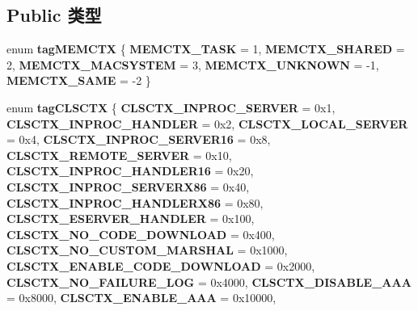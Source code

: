 \subsection*{Public 类型}
\begin{DoxyCompactItemize}
\item 
\mbox{\label{interface_i_win_types_a9f3ae7ecdd308d3515e985c7348262c6}} 
enum {\bfseries tag\+M\+E\+M\+C\+TX} \{ \newline
{\bfseries M\+E\+M\+C\+T\+X\+\_\+\+T\+A\+SK} = 1, 
{\bfseries M\+E\+M\+C\+T\+X\+\_\+\+S\+H\+A\+R\+ED} = 2, 
{\bfseries M\+E\+M\+C\+T\+X\+\_\+\+M\+A\+C\+S\+Y\+S\+T\+EM} = 3, 
{\bfseries M\+E\+M\+C\+T\+X\+\_\+\+U\+N\+K\+N\+O\+WN} = -\/1, 
\newline
{\bfseries M\+E\+M\+C\+T\+X\+\_\+\+S\+A\+ME} = -\/2
 \}
\item 
\mbox{\label{interface_i_win_types_adf475a0cc4529d6fc873171af2eef672}} 
enum {\bfseries tag\+C\+L\+S\+C\+TX} \{ \newline
{\bfseries C\+L\+S\+C\+T\+X\+\_\+\+I\+N\+P\+R\+O\+C\+\_\+\+S\+E\+R\+V\+ER} = 0x1, 
{\bfseries C\+L\+S\+C\+T\+X\+\_\+\+I\+N\+P\+R\+O\+C\+\_\+\+H\+A\+N\+D\+L\+ER} = 0x2, 
{\bfseries C\+L\+S\+C\+T\+X\+\_\+\+L\+O\+C\+A\+L\+\_\+\+S\+E\+R\+V\+ER} = 0x4, 
{\bfseries C\+L\+S\+C\+T\+X\+\_\+\+I\+N\+P\+R\+O\+C\+\_\+\+S\+E\+R\+V\+E\+R16} = 0x8, 
\newline
{\bfseries C\+L\+S\+C\+T\+X\+\_\+\+R\+E\+M\+O\+T\+E\+\_\+\+S\+E\+R\+V\+ER} = 0x10, 
{\bfseries C\+L\+S\+C\+T\+X\+\_\+\+I\+N\+P\+R\+O\+C\+\_\+\+H\+A\+N\+D\+L\+E\+R16} = 0x20, 
{\bfseries C\+L\+S\+C\+T\+X\+\_\+\+I\+N\+P\+R\+O\+C\+\_\+\+S\+E\+R\+V\+E\+R\+X86} = 0x40, 
{\bfseries C\+L\+S\+C\+T\+X\+\_\+\+I\+N\+P\+R\+O\+C\+\_\+\+H\+A\+N\+D\+L\+E\+R\+X86} = 0x80, 
\newline
{\bfseries C\+L\+S\+C\+T\+X\+\_\+\+E\+S\+E\+R\+V\+E\+R\+\_\+\+H\+A\+N\+D\+L\+ER} = 0x100, 
{\bfseries C\+L\+S\+C\+T\+X\+\_\+\+N\+O\+\_\+\+C\+O\+D\+E\+\_\+\+D\+O\+W\+N\+L\+O\+AD} = 0x400, 
{\bfseries C\+L\+S\+C\+T\+X\+\_\+\+N\+O\+\_\+\+C\+U\+S\+T\+O\+M\+\_\+\+M\+A\+R\+S\+H\+AL} = 0x1000, 
{\bfseries C\+L\+S\+C\+T\+X\+\_\+\+E\+N\+A\+B\+L\+E\+\_\+\+C\+O\+D\+E\+\_\+\+D\+O\+W\+N\+L\+O\+AD} = 0x2000, 
\newline
{\bfseries C\+L\+S\+C\+T\+X\+\_\+\+N\+O\+\_\+\+F\+A\+I\+L\+U\+R\+E\+\_\+\+L\+OG} = 0x4000, 
{\bfseries C\+L\+S\+C\+T\+X\+\_\+\+D\+I\+S\+A\+B\+L\+E\+\_\+\+A\+AA} = 0x8000, 
{\bfseries C\+L\+S\+C\+T\+X\+\_\+\+E\+N\+A\+B\+L\+E\+\_\+\+A\+AA} = 0x10000, 

\end{DoxyCompactItemize}
